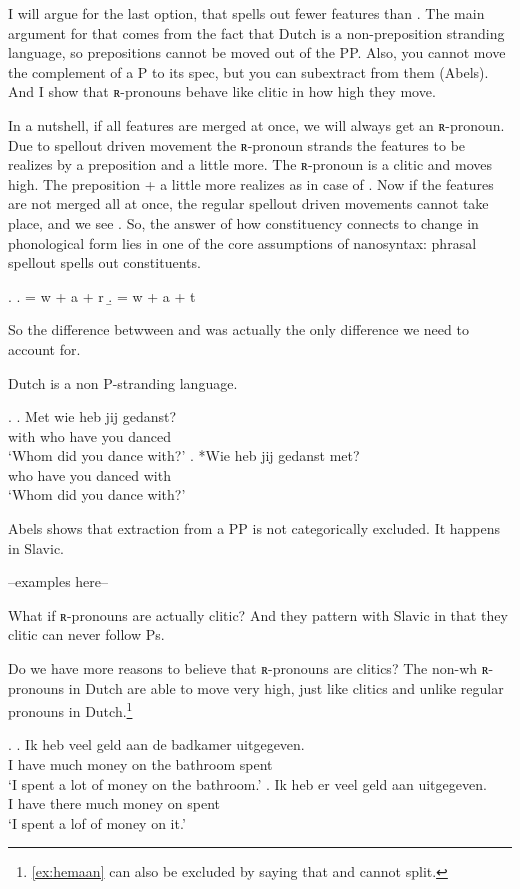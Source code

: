 \documentclass{article}
\begin{document}
I will argue for the last option, that  spells out fewer features than . The main argument for that comes from the fact that Dutch is a non-preposition stranding language, so prepositions cannot be moved out of the PP. Also, you cannot move the complement of a P to its spec, but you can subextract from them (Abels). And I show that ʀ-pronouns behave like clitic in how high they move.

In a nutshell, if all features are merged at once, we will always get an ʀ-pronoun. Due to spellout driven movement the ʀ-pronoun strands the features to be realizes by a preposition and a little more. The ʀ-pronoun is a clitic and moves high. The preposition + a little more realizes as  in case of . Now if the features are not merged all at once, the regular spellout driven movements cannot take place, and we see . So, the answer of how constituency connects to change in phonological form lies in one of the core assumptions of nanosyntax: phrasal spellout spells out constituents.

\ex.
\a.  = w + a + r
\b.  = w + a + t

So the difference betwween  and  was actually the only difference we need to account for.

Dutch is a non P-stranding language.

\ex.
\ag. Met wie heb jij gedanst?\\
 with who have you danced\\
 `Whom did you dance with?'
\bg. *Wie heb jij gedanst met?\\
 who have you danced with\\
 `Whom did you dance with?'

Abels shows that extraction from a PP is not categorically excluded. It happens in Slavic.

--examples here--

What if ʀ-pronouns are actually clitic? And they pattern with Slavic in that they clitic can never follow Ps.

Do we have more reasons to believe that ʀ-pronouns are clitics? The non-wh ʀ-pronouns in Dutch are able to move very high, just like clitics and unlike regular pronouns in Dutch.\footnote{\ref{ex:hemaan} can also be excluded by saying that  and  cannot split.}

\ex.
\ag. Ik heb veel geld aan de badkamer uitgegeven.\\
 I have much money on the bathroom spent\\
 `I spent a lot of money on the bathroom.'
\bg. Ik heb er veel geld aan uitgegeven.\\
 I have there much money on spent\\
 `I spent a lof of money on it.'
\end{document}
